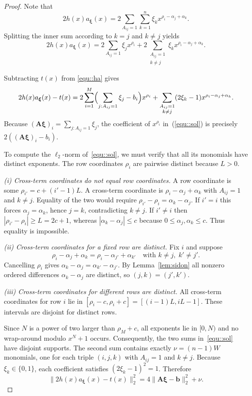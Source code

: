 \begin{proof}
Note that
\[
2h(x)a_{\boldsymbol{\xi}}(x)
= 2\sum_{A_{ij}=1}\sum_{k=1}^n \xi_k x^{\rho_i - \alpha_j + \alpha_k}.
\]
Splitting the inner sum according to $k=j$ and $k\neq j$ yields
\begin{equation}
2h(x)a_{\boldsymbol{\xi}}(x)
= 2\sum_{A_{ij}=1} \xi_j x^{\rho_i}
+ 2\sum_{\substack{A_{ij}=1\\k\neq j}} \xi_k x^{\rho_i - \alpha_j + \alpha_k}.
\label{equ::ha}
\end{equation}

Subtracting $t(x)$ from \eqref{equ::ha} gives
\begin{equation}
2h(x)a_{\boldsymbol{\xi}}(x) - t(x)
= 2\sum_{i=1}^M\Bigl(\sum_{j:A_{ij}=1}\xi_j - b_i\Bigr)x^{\rho_i}
+ \sum_{\substack{A_{ij}=1\\k\neq j}}(2\xi_k - 1)x^{\rho_i - \alpha_j + \alpha_k}.
\label{equ::sol}
\end{equation}
Because $(\mathbf{A}\boldsymbol{\xi})_i=\sum_{j:A_{ij}=1}\xi_j$, the coefficient of $x^{\rho_i}$ in~(\ref{equ::sol}) is precisely $2((\mathbf{A}\boldsymbol{\xi})_i-b_i)$.

To compute the \(\ell_2\)-norm of~\eqref{equ::sol}, we must verify that all its monomials have distinct exponents.
The row coordinates \(\rho_i\) are pairwise distinct because \(L>0\).

\textit{(i) Cross-term coordinates do not equal row
coordinates.}
A row coordinate is some
$\rho_{i'}=c+(i'-1)L$. A cross-term coordinate is
$\rho_i-\alpha_j+\alpha_k$ with $A_{ij}=1$ and $k\neq j$. Equality of the two
would require $\rho_{i'}-\rho_i=\alpha_k-\alpha_j$. If $i'=i$ this forces
$\alpha_j=\alpha_k$, hence $j=k$, contradicting $k\neq j$. If $i'\neq i$
then $|\rho_{i'}-\rho_i|\ge L=2c+1$, whereas $|\alpha_k-\alpha_j|\le c$
because $0\le\alpha_j,\alpha_k\le c$.
Thus equality is impossible.

\textit{(ii) Cross-term coordinates for a fixed row are
distinct.}
Fix $i$ and suppose
\[
\rho_i-\alpha_j+\alpha_k = \rho_i-\alpha_{j'}+\alpha_{k'}
\quad\text{with }k\neq j,\; k'\neq j'.
\]
Cancelling $\rho_i$ gives $\alpha_k-\alpha_j=\alpha_{k'}-\alpha_{j'}$. By
Lemma~\ref{lem:sidon} all nonzero ordered differences $\alpha_k-\alpha_j$ are distinct,
so $(j,k)=(j',k')$.

\textit{(iii) Cross-term coordinates for different rows are distinct.}
All cross-term coordinates for row \(i\) lie in
\([\rho_i-c,\rho_i+c]=[(i-1)L,iL-1]\).  These intervals are disjoint for
distinct rows.

Since $N$ is a power of two larger than $\rho_M+c$, all exponents lie in
$[0,N)$ and no wrap-around modulo $x^N+1$ occurs.  Consequently, the two sums
in~\eqref{equ::sol} have disjoint supports.  The second sum contains exactly
$\nu=(n-1)W$ monomials, one for each triple $(i,j,k)$ with $A_{ij}=1$ and
$k\neq j$.  Because $\xi_k\in\{0,1\}$, each coefficient satisfies
$(2\xi_k-1)^2=1$.  Therefore
\[
\|2h(x)a_{\boldsymbol{\xi}}(x)-t(x)\|_2^2
=4\|\mathbf{A}\boldsymbol{\xi}-\mathbf{b}\|_2^2+\nu.
\]
\end{proof}

